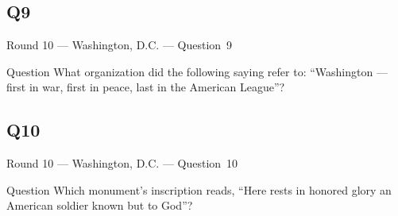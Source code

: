 \documentclass[11pt]{beamer}
\begin{document}
\subsection*{Q9}
\begin{frame}[t]{Round 10 --- Washington, D.C. --- \mbox{Question 9}}
\vspace{-0.5em}
\begin{block}{Question}
What organization did the following saying refer to: ``Washington --- first in war, first in peace, last in the American League''?
\end{block}
\end{frame}
\subsection*{Q10}
\begin{frame}[t]{Round 10 --- Washington, D.C. --- \mbox{Question 10}}
\vspace{-0.5em}
\begin{block}{Question}
Which monument's inscription reads, ``Here rests in honored glory an American soldier known but to God''?
\end{block}
\end{frame}
\end{document}
